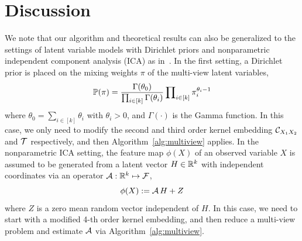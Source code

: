 \documentclass{article}
\begin{document}
\vspace{-3mm}
\section{Discussion}
\vspace{-2mm}

We note that our algorithm and theoretical results can also be generalized to the settings of latent variable models with Dirichlet priors and nonparametric independent component analysis (ICA) as in~\citet{AnandkumarEtal:tensor12}. In the first setting, a Dirichlet prior is placed on the mixing weights $\pi$ of the multi-view latent variables,
$$
	\mathbb{P}(\pi) = \frac{\Gamma(\theta_0)}{\prod\nolimits_{i \in [k]} \Gamma(\theta_i)} \prod\nolimits_{i \in [k]} \pi_i^{\theta_i - 1}
$$
where $\theta_0 = \sum_{i \in [k]} \theta_i$ with $\theta_i > 0$, and $\Gamma(\cdot)$ is the Gamma function. In this case, we only need to modify the second and third order kernel embedding $\mathcal{C}_{X_1X_2}$ and ${\mathcal{T}}$ respectively, and then Algorithm~\ref{alg:multiview} applies. In the nonparametric ICA setting, the feature map $\phi(X)$ of an observed variable $X$ is assumed to be generated from a latent vector $H \in \mathbb{R}^k$ with independent coordinates via an operator $\mathcal{A}:\mathbb{R}^k \mapsto \mathcal{F}$,
$$
	\phi(X) := \mathcal{A}\, H + Z
$$
where $Z$ is a zero mean random vector independent of $H$. In this case,
we need to start with a modified 4-th order kernel embedding, and then reduce a multi-view problem and estimate $\mathcal{A}$ via Algorithm~\ref{alg:multiview}.
\end{document}
